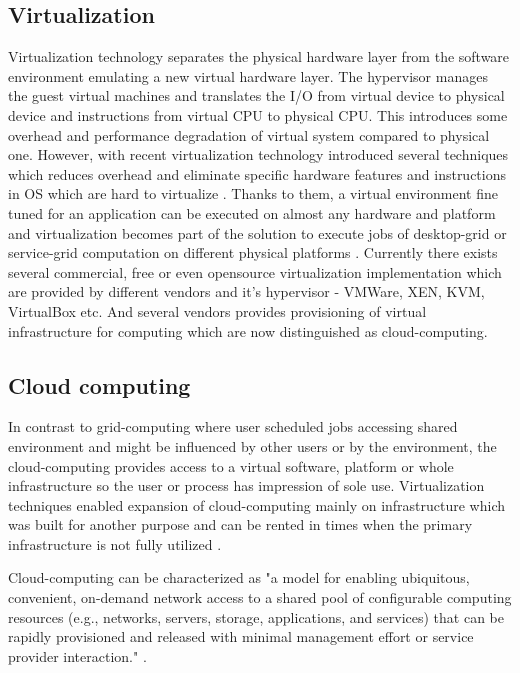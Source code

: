 \subsection{Virtualization}
\label{sec:introvirtual}
Virtualization technology separates the physical hardware layer from the software environment emulating a new virtual hardware layer. The hypervisor manages the guest virtual machines and translates the I/O from virtual device to physical device and instructions from virtual CPU to physical CPU. This introduces some overhead and performance degradation of virtual system compared to physical one. However, with recent virtualization technology introduced several techniques which reduces overhead and eliminate specific hardware features and instructions in OS which are hard to virtualize \cite{Barham2003,Youseff2006}.
Thanks to them, a virtual environment fine tuned for an application can be executed on almost any hardware and platform and virtualization becomes part of the solution to execute jobs of desktop-grid or service-grid computation on different physical platforms \cite{ruda2009virtual}.
Currently there exists several commercial, free or even opensource virtualization implementation which are provided by different vendors and it's hypervisor - VMWare, XEN, KVM, VirtualBox etc. And several vendors provides provisioning of virtual infrastructure for computing which are now distinguished as cloud-computing.

\subsection{Cloud computing}

In contrast to grid-computing where user scheduled jobs accessing shared environment and might be influenced by other users or by the environment, the cloud-computing provides access to a virtual software, platform or whole infrastructure so the user or process has impression of sole use. Virtualization techniques enabled expansion of cloud-computing mainly on infrastructure which was built for another purpose and can be rented in times when the primary infrastructure is not fully utilized \cite{Foster2008}. 

Cloud-computing can be characterized as "a model for enabling ubiquitous, convenient, on-demand network access to a shared pool of configurable computing resources (e.g., networks, servers, storage, applications, and services) that can be rapidly provisioned and released with minimal management effort or service provider interaction."  \cite{Mell2011}.  

